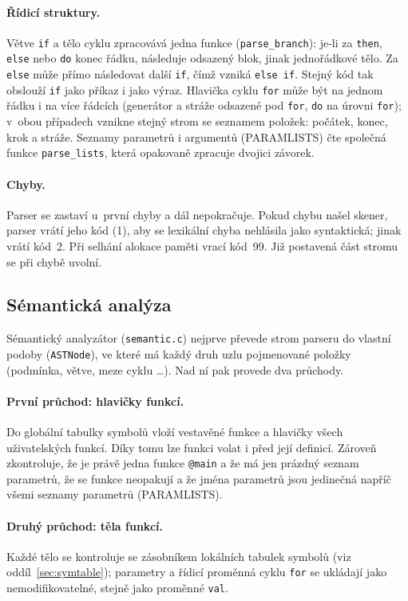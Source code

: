 \documentclass[11pt,a4paper]{article}
\begin{document}
\paragraph{Řídicí struktury.}
Větve \texttt{if} a tělo cyklu zpracovává jedna funkce
(\texttt{parse\_branch}): je-li za \texttt{then}, \texttt{else} nebo
\texttt{do} konec řádku, následuje odsazený blok, jinak jednořádkové tělo.
Za \texttt{else} může přímo následovat další \texttt{if}, čímž vzniká
\texttt{else if}. Stejný kód tak obslouží \texttt{if} jako příkaz i jako
výraz. Hlavička cyklu \texttt{for} může být na jednom řádku i na více
řádcích (generátor a stráže odsazené pod \texttt{for}, \texttt{do} na
úrovni \texttt{for}); v~obou případech vznikne stejný strom se seznamem
položek: počátek, konec, krok a stráže. Seznamy parametrů i argumentů
(PARAMLISTS) čte společná funkce \texttt{parse\_lists}, která opakovaně
zpracuje dvojici závorek.

\paragraph{Chyby.}
Parser se zastaví u~první chyby a dál nepokračuje. Pokud chybu našel
skener, parser vrátí jeho kód (1), aby se lexikální chyba nehlásila jako
syntaktická; jinak vrátí kód~2. Při selhání alokace paměti vrací kód~99.
Již postavená část stromu se při chybě uvolní.
\subsection{Sémantická analýza}
Sémantický analyzátor (\texttt{semantic.c}) nejprve převede strom parseru
do vlastní podoby (\texttt{ASTNode}), ve které má každý druh uzlu
pojmenované položky (podmínka, větve, meze cyklu \dots). Nad ní pak
provede dva průchody.

\paragraph{První průchod: hlavičky funkcí.}
Do globální tabulky symbolů vloží vestavěné funkce a hlavičky všech
uživatelských funkcí. Díky tomu lze funkci volat i před její definicí.
Zároveň zkontroluje, že je právě jedna funkce \texttt{@main} a že má jen
prázdný seznam parametrů, že se funkce neopakují a že jména parametrů jsou
jedinečná napříč všemi seznamy parametrů (PARAMLISTS).

\paragraph{Druhý průchod: těla funkcí.}
Každé tělo se kontroluje se zásobníkem lokálních tabulek symbolů
(viz oddíl~\ref{sec:symtable}); parametry a řídicí proměnná cyklu
\texttt{for} se ukládají jako nemodifikovatelné, stejně jako
proměnné \texttt{val}.
\end{document}
